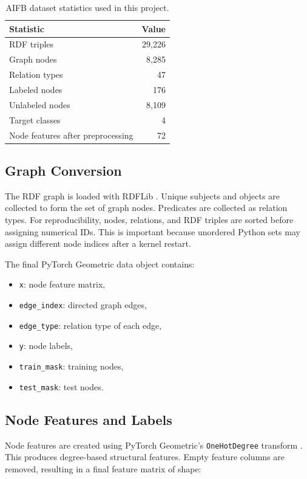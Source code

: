 \documentclass[runningheads]{llncs}
\begin{document}
\begin{table}
\centering
\caption{AIFB dataset statistics used in this project.}
\begin{tabular}{|l|r|}
\hline
Statistic & Value \\
\hline
RDF triples & 29,226 \\
\hline
Graph nodes & 8,285 \\
\hline
Relation types & 47 \\
\hline
Labeled nodes & 176 \\
\hline
Unlabeled nodes & 8,109 \\
\hline
Target classes & 4 \\
\hline
Node features after preprocessing & 72 \\
\hline
\end{tabular}
\end{table}

\subsection{Graph Conversion}

The RDF graph is loaded with RDFLib \cite{rdflib}. Unique subjects and objects are collected to form the set of graph nodes. Predicates are collected as relation types. For reproducibility, nodes, relations, and RDF triples are sorted before assigning numerical IDs. This is important because unordered Python sets may assign different node indices after a kernel restart.

The final PyTorch Geometric data object contains:

\begin{itemize}
    \item \texttt{x}: node feature matrix,
    \item \texttt{edge\_index}: directed graph edges,
    \item \texttt{edge\_type}: relation type of each edge,
    \item \texttt{y}: node labels,
    \item \texttt{train\_mask}: training nodes,
    \item \texttt{test\_mask}: test nodes.
\end{itemize}

\subsection{Node Features and Labels}

Node features are created using PyTorch Geometric's \texttt{OneHotDegree} transform \cite{pygdocs}. This produces degree-based structural features. Empty feature columns are removed, resulting in a final feature matrix of shape:
\end{document}
